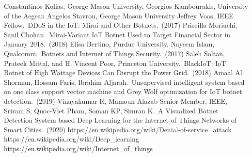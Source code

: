 \documentclass[conference]{IEEEtran}
\begin{document}
\begin{thebibliography}{00}
 Constantinos Kolias, George Mason University, Georgios Kambourakis, University of the Aegean Angelos Stavrou, George Mason University Jeffrey Voas, IEEE Fellow. DDoS in the IoT: Mirai and Other Botnets. (2017) 
Priscilla Moriuchi, Sanil Chohan. Mirai-Variant IoT Botnet Used to Target Financial Sector in January 2018. (2018)
Elisa Bertino, Purdue University, Nayeem Islam, Qualcomm. Botnets and Internet of Things Security. (2017) 
Saleh Soltan, Prateek Mittal, and H. Vincent Poor, Princeton University. BlackIoT: IoT Botnet of High Wattage Devices Can Disrupt the Power Grid. (2018) 
Amaal Al Shorman, Hossam Faris, Ibrahim Aljarah. Unsupervised intelligent system based on one class support vector machine and Grey Wolf optimization for IoT botnet detection. (2019) 
Vinayakumar R, Mamoun Alazab Senior Member, IEEE, Sriram S, Quoc-Viet Pham, Soman KP, Simran K. A Visualized Botnet Detection System based Deep Learning for the Internet of Things Networks of Smart Cities. (2020) 
https://en.wikipedia.org/wiki/Denial-of-service\_attack
https://en.wikipedia.org/wiki/Deep\_learning
https://en.wikipedia.org/wiki/Internet\_of\_things
\end{thebibliography}
\vspace{12pt}
\end{document}
